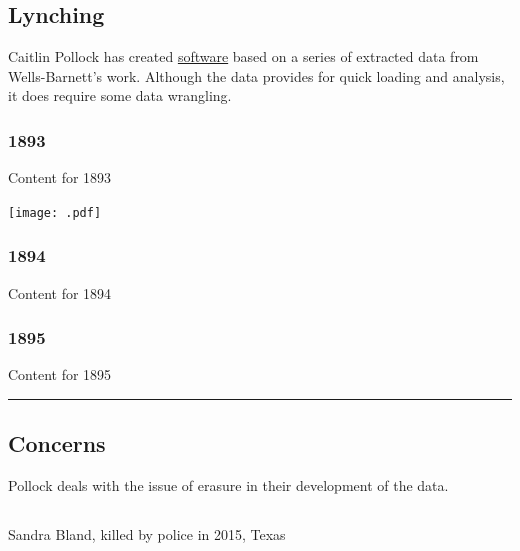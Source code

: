 \documentclass[
  letterpaper,
  DIV=11,
  numbers=noendperiod]{scrartcl}
\begin{document}
\hypertarget{lynching}{%
\subsection{Lynching}\label{lynching}}

Caitlin Pollock has created
\href{https://redrecord.cmjpollock.com/}{software} based on a series of
extracted data from Wells-Barnett's work. Although the data provides for
quick loading and analysis, it does require some data wrangling.

\subsubsection{1893}

Content for 1893

\texttt{[image: .pdf]}

\subsubsection{1894}

Content for 1894

\subsubsection{1895}

Content for 1895

\begin{center}\rule{0.5\linewidth}{0.5pt}\end{center}

\hypertarget{concerns}{%
\subsection{Concerns}\label{concerns}}

Pollock deals with the issue of erasure in their development of the
data.

\hypertarget{section-3}{%
\subsection{}\label{section-3}}

Sandra Bland, killed by police in 2015, Texas

\hypertarget{section-4}{%
\subsection{}\label{section-4}}
\end{document}

